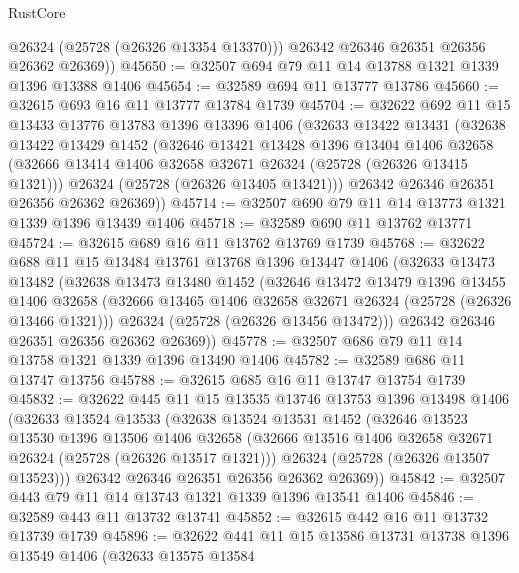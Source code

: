 \begin{lexlean}{RustCore}
\begin{coremodule}
          @26324
          (@25728 (@26326 @13354 @13370)))
        @26342
        @26346
        @26351
        @26356
        @26362
        @26369))
@45650 := @32507 @694 @79 @11 @14 @13788 @1321 @1339 @1396 @13388 @1406
@45654 := @32589 @694 @11 @13777 @13786
@45660 := @32615 @693 @16 @11 @13777 @13784 @1739
@45704 := @32622
    @692
    @11
    @15
    @13433
    @13776
    @13783
    @1396
    @13396
    @1406
    (@32633
      @13422
      @13431
      (@32638
        @13422
        @13429
        @1452
        (@32646
          @13421
          @13428
          @1396
          @13404
          @1406
          @32658
          (@32666 @13414 @1406 @32658 @32671 @26324 (@25728 (@26326 @13415 @1321)))
          @26324
          (@25728 (@26326 @13405 @13421)))
        @26342
        @26346
        @26351
        @26356
        @26362
        @26369))
@45714 := @32507 @690 @79 @11 @14 @13773 @1321 @1339 @1396 @13439 @1406
@45718 := @32589 @690 @11 @13762 @13771
@45724 := @32615 @689 @16 @11 @13762 @13769 @1739
@45768 := @32622
    @688
    @11
    @15
    @13484
    @13761
    @13768
    @1396
    @13447
    @1406
    (@32633
      @13473
      @13482
      (@32638
        @13473
        @13480
        @1452
        (@32646
          @13472
          @13479
          @1396
          @13455
          @1406
          @32658
          (@32666 @13465 @1406 @32658 @32671 @26324 (@25728 (@26326 @13466 @1321)))
          @26324
          (@25728 (@26326 @13456 @13472)))
        @26342
        @26346
        @26351
        @26356
        @26362
        @26369))
@45778 := @32507 @686 @79 @11 @14 @13758 @1321 @1339 @1396 @13490 @1406
@45782 := @32589 @686 @11 @13747 @13756
@45788 := @32615 @685 @16 @11 @13747 @13754 @1739
@45832 := @32622
    @445
    @11
    @15
    @13535
    @13746
    @13753
    @1396
    @13498
    @1406
    (@32633
      @13524
      @13533
      (@32638
        @13524
        @13531
        @1452
        (@32646
          @13523
          @13530
          @1396
          @13506
          @1406
          @32658
          (@32666 @13516 @1406 @32658 @32671 @26324 (@25728 (@26326 @13517 @1321)))
          @26324
          (@25728 (@26326 @13507 @13523)))
        @26342
        @26346
        @26351
        @26356
        @26362
        @26369))
@45842 := @32507 @443 @79 @11 @14 @13743 @1321 @1339 @1396 @13541 @1406
@45846 := @32589 @443 @11 @13732 @13741
@45852 := @32615 @442 @16 @11 @13732 @13739 @1739
@45896 := @32622
    @441
    @11
    @15
    @13586
    @13731
    @13738
    @1396
    @13549
    @1406
    (@32633
      @13575
      @13584

\end{coremodule}
\end{lexlean}
